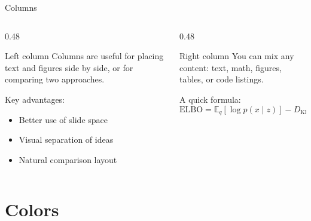 \documentclass[aspectratio=169]{beamer}
\begin{document}
\begin{frame}{Columns}
    \begin{columns}[T]
        \begin{column}{0.48\textwidth}
            \begin{problock}{Left column}
                Columns are useful for placing text and figures
                side by side, or for comparing two approaches.
            \end{problock}

            \vspace{0.2cm}
            Key advantages:
            \begin{itemize}
                \item Better use of slide space
                \item Visual separation of ideas
                \item Natural comparison layout
            \end{itemize}
        \end{column}

        \begin{column}{0.48\textwidth}
            \begin{problock}{Right column}
                You can mix any content: text, math, figures,
                tables, or code listings.
            \end{problock}

            \vspace{0.2cm}
            A quick formula:
            \[
                \text{ELBO} = \mathbb{E}_{q}[\log p(x \mid z)]
                - D_{\text{KL}}(q \| p)
            \]
        \end{column}
    \end{columns}
\end{frame}

\section{Colors}

\end{document}
